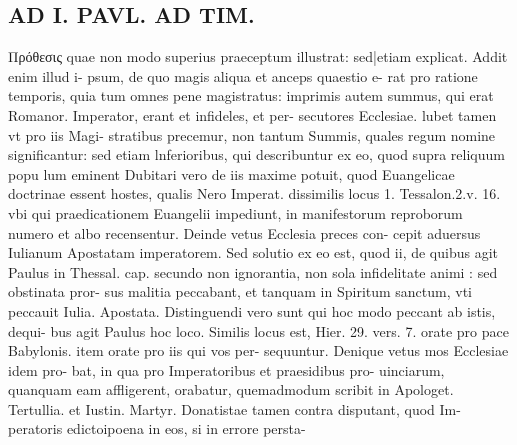\documentclass{article}
\begin{document}
\begin{pages}
\section*{AD I. PAVL. AD TIM. }
\marginpar{[ p.48 ]}\pstart Πρόθεσις quae non modo superius praeceptum illustrat: sed|etiam explicat. Addit enim illud i- psum, de quo magis aliqua et anceps quaestio e- rat pro ratione temporis, quia tum omnes pene magistratus: imprimis autem summus, qui erat Romanor. Imperator, erant et infideles, et per- secutores Ecclesiae. lubet tamen vt pro iis Magi- stratibus precemur, non tantum Summis, quales regum nomine significantur: sed etiam lnferioribus, qui describuntur ex eo, quod supra reliquum popu lum eminent Dubitari vero de iis maxime potuit, quod Euangelicae doctrinae essent hostes, qualis Nero Imperat. dissimilis locus 1. Tessalon.2.v. 16. vbi qui praedicationem Euangelii impediunt, in manifestorum reproborum numero et albo recensentur. Deinde vetus Ecclesia preces con- cepit aduersus Iulianum Apostatam imperatorem. Sed solutio ex eo est, quod ii, de quibus agit Paulus in Thessal. cap. secundo non ignorantia, non sola infidelitate animi : sed obstinata pror- sus malitia peccabant, et tanquam in Spiritum sanctum, vti peccauit Iulia. Apostata. Distinguendi vero sunt qui hoc modo peccant ab istis, dequi- bus agit Paulus hoc loco. Similis locus est, Hier. 29. vers. 7. orate pro pace Babylonis. item orate pro iis qui vos per- sequuntur. Denique vetus mos Ecclesiae idem pro- bat, in qua pro Imperatoribus et praesidibus pro- uinciarum, quanquam eam affligerent, orabatur, quemadmodum scribit in Apologet. Tertullia. et Iustin. Martyr. Donatistae tamen contra disputant, quod Im- peratoris edictoipoena in eos, si in errore persta-  \pend

\end{pages}
\end{document}
